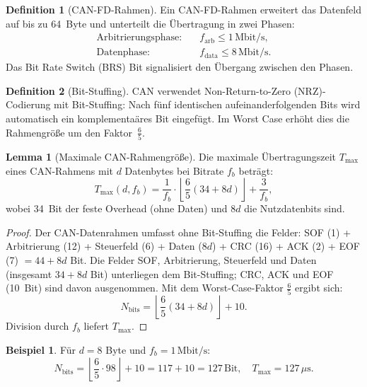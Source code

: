 ﻿\documentclass[a4paper,12pt]{article}
\theoremstyle{definition}
\newtheorem{definition}{Definition}
\newtheorem{beispiel}{Beispiel}
\newtheorem{lemma}{Lemma}
\begin{document}
\begin{definition}[CAN-FD-Rahmen]
Ein CAN-FD-Rahmen erweitert das Datenfeld auf bis zu 64~Byte und unterteilt
die \"{U}bertragung in zwei Phasen:
\begin{align*}
    \text{Arbitrierungsphase:} &\quad f_{\mathrm{arb}} \leq 1\,\text{Mbit/s}, \\
    \text{Datenphase:}         &\quad f_{\mathrm{data}} \leq 8\,\text{Mbit/s}.
\end{align*}
Das Bit Rate Switch (BRS) Bit signalisiert den \"{U}bergang zwischen den Phasen.
\end{definition}

\begin{definition}[Bit-Stuffing]
CAN verwendet Non-Return-to-Zero (NRZ)-Codierung mit Bit-Stuffing:
Nach f\"{u}nf identischen aufeinanderfolgenden Bits wird automatisch ein komplementa\"{a}res
Bit eingef\"{u}gt.
Im Worst Case erh\"{o}ht dies die Rahmengr\"{o}\ss{}e um den Faktor~$\frac{6}{5}$.
\end{definition}

\begin{lemma}[Maximale CAN-Rahmengr\"{o}\ss{}e]
\label{lem:framesize}
Die maximale \"{U}bertragungszeit $T_{\max}$ eines CAN-Rahmens mit $d$ Datenbytes
bei Bitrate $f_b$ betr\"{a}gt:
\[
    T_{\max}(d, f_b)
    = \frac{1}{f_b} \cdot \left\lfloor \frac{6}{5}(34 + 8d) \right\rfloor + \frac{3}{f_b},
\]
wobei 34~Bit der feste Overhead (ohne Daten) und $8d$ die Nutzdatenbits sind.
\end{lemma}

\begin{proof}
Der CAN-Datenrahmen umfasst ohne Bit-Stuffing die Felder:
SOF (1) + Arbitrierung (12) + Steuerfeld (6) + Daten ($8d$) + CRC (16) + ACK (2) + EOF (7) $= 44 + 8d$ Bit.
Die Felder SOF, Arbitrierung, Steuerfeld und Daten (insgesamt $34 + 8d$ Bit)
unterliegen dem Bit-Stuffing; CRC, ACK und EOF (10~Bit) sind davon ausgenommen.
Mit dem Worst-Case-Faktor $\frac{6}{5}$ ergibt sich:
\[
    N_{\mathrm{bits}} = \left\lfloor \frac{6}{5}(34 + 8d) \right\rfloor + 10.
\]
Division durch $f_b$ liefert $T_{\max}$.
\end{proof}

\begin{beispiel}
F\"{u}r $d = 8$ Byte und $f_b = 1\,\text{Mbit/s}$:
\[
    N_{\mathrm{bits}} = \left\lfloor \frac{6}{5} \cdot 98 \right\rfloor + 10
    = 117 + 10 = 127\,\text{Bit},
    \quad
    T_{\max} = 127\,\mu\text{s}.
\]
\end{beispiel}
\end{document}
